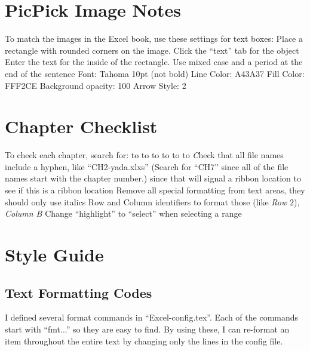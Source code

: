 \begin{enumerate}[resume]
\section{PicPick Image Notes}
To match the images in the Excel book, use these settings for text boxes:
Place a rectangle with rounded corners on the image.
Click the ``text'' tab for the object
Enter the text for the inside of the rectangle. Use mixed case and a period at the end of the sentence
Font: Tahoma 10pt (not bold)
Line Color: A43A37
Fill Color: FFF2CE
Background opacity: 100%
Arrow Style: 2


\section{Chapter Checklist}

To check each chapter, search for:
\fmtPopupButton to \fmtButton
\fmtRibbonButton to \fmtButton
\fmtWorksheetName to \fmtWorksheet
\fmtWorkbookName to \fmtWorksheet
\fmtCellLocation to \fmtLoc
\fmtPopupBox to \textit
Check that all file names include a hyphen, like ``CH2-yada.xlxs'' (Search for ``CH7'' since all of the file names start with the chapter number.)
\fmtRibbonGroup since that will signal a ribbon location
\fmtRibbonTab to see if this is a ribbon location
Remove all special formatting from text areas, they should only use italics
Row and Column identifiers to format those (like \textit{Row} $ 2 $), \textit{Column B}
Change ``highlight'' to ``select'' when selecting a range

\section{Style Guide}

\subsection{Text Formatting Codes}
I defined several format commands in ``Excel-config.tex''. Each of the commands start with ``fmt...'' so they are easy to find. By using these, I can re-format an item throughout the entire text by changing only the lines in the config file.


\end{enumerate}
